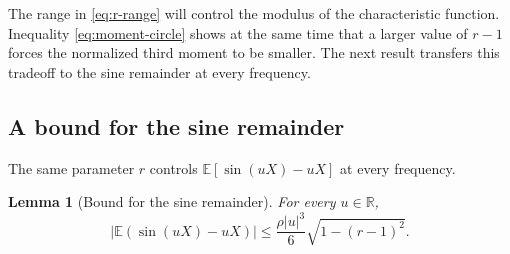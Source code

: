 \documentclass[11pt]{article}
\newtheorem{lemma}[theorem]{Lemma}
\newcommand{\E}{\mathbb E}
\newcommand{\R}{\mathbb R}
\newcommand{\abs}[1]{\lvert#1\rvert}
\begin{document}
The range in \eqref{eq:r-range} will control the modulus of the characteristic
function. Inequality \eqref{eq:moment-circle} shows at the same time that a
larger value of \(r-1\) forces the normalized third moment to be smaller.  The
next result transfers this tradeoff to the sine remainder at every frequency.

\subsection{A bound for the sine remainder}

The same parameter \(r\) controls \(\E[\sin(uX)-uX]\) at every frequency.

\begin{lemma}[Bound for the sine remainder]\label{lem:sine-circle}
For every \(u\in\R\),
\[
 \abs{\E(\sin(uX)-uX)}
 \le\frac{\rho\abs u^3}{6}\sqrt{1-(r-1)^2}.
 \label{eq:sine-circle}\tag{2.5}
\]
\end{lemma}
\end{document}

